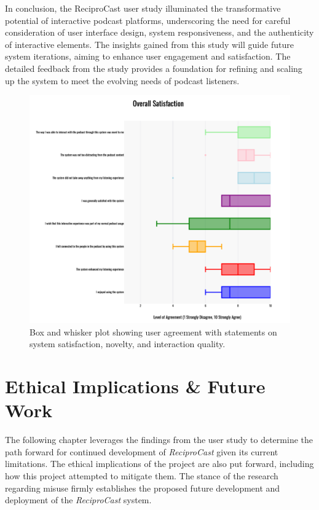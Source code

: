 \documentclass[12pt]{report}
\begin{document}
\begin{myfont}
        \indent In conclusion, the ReciproCast user study illuminated the transformative potential of interactive podcast platforms, underscoring the need for careful consideration of user interface design, system responsiveness, and the authenticity of interactive elements. The insights gained from this study will guide future system iterations, aiming to enhance user engagement and satisfaction. The detailed feedback from the study provides a foundation for refining and scaling up the system to meet the evolving needs of podcast listeners.

        \begin{figure}[H]
        \centering
          \includegraphics[width=1\textwidth]{figures/satisfaction.png}
          \caption{Box and whisker plot showing user agreement with statements on system satisfaction, novelty, and interaction quality.}
          \label{fig:satisfaction}
        \end{figure}

        \clearpage

        \chapter{Ethical Implications \& Future Work}
        The following chapter leverages the findings from the user study to determine the path forward for continued development of \textit{ReciproCast} given its current limitations. The ethical implications of the project are also put forward, including how this project attempted to mitigate them. The stance of the research regarding misuse firmly establishes the proposed future development and deployment of the \textit{ReciproCast} system.
        

\end{myfont}
\end{document}

